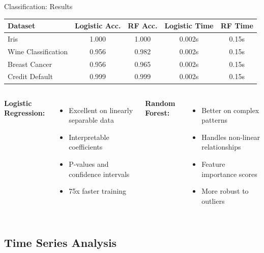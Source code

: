 \documentclass[aspectratio=169,10pt]{beamer}
\begin{document}
\begin{frame}{Classification: Results}
\begin{center}
\begin{tabular}{lcccc}
\toprule
\textbf{Dataset} & \textbf{Logistic Acc.} & \textbf{RF Acc.} & \textbf{Logistic Time} & \textbf{RF Time} \\
\midrule
Iris & \textcolor{accentcolor}{1.000} & \textcolor{accentcolor}{1.000} & 0.002s & 0.15s \\
Wine Classification & 0.956 & \textcolor{mlcolor}{0.982} & 0.002s & 0.15s \\
Breast Cancer & 0.956 & \textcolor{mlcolor}{0.965} & 0.002s & 0.15s \\
Credit Default & \textcolor{accentcolor}{0.999} & \textcolor{accentcolor}{0.999} & 0.002s & 0.15s \\
\bottomrule
\end{tabular}
\end{center}

\vspace{0.5cm}

\begin{columns}
\textcolor{statcolor}{\textbf{Logistic Regression:}}
\begin{itemize}
    \item Excellent on linearly separable data
    \item Interpretable coefficients
    \item P-values and confidence intervals
    \item 75x faster training
\end{itemize}

\textcolor{mlcolor}{\textbf{Random Forest:}}
\begin{itemize}
    \item Better on complex patterns
    \item Handles non-linear relationships
    \item Feature importance scores
    \item More robust to outliers
\end{itemize}
\end{columns}
\end{frame}

\subsection{Time Series Analysis}
\end{document}
